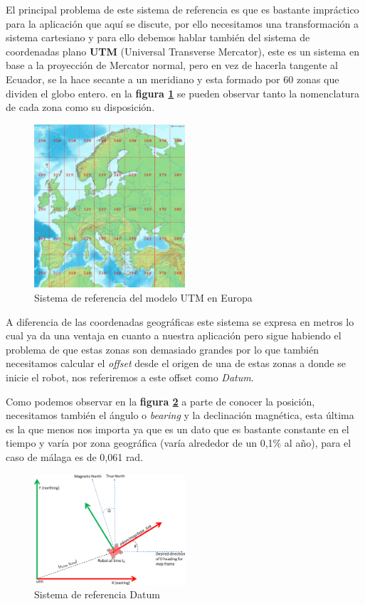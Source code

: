 El principal problema de este sistema de referencia es que es bastante impráctico para la aplicación que aquí se discute, por ello 
necesitamos una transformación a sistema cartesiano y para ello debemos hablar también del sistema de coordenadas plano \textbf{UTM} 
(Universal Transverse Mercator), este es un sistema en base a la proyección de Mercator normal, pero en vez de hacerla tangente al Ecuador, 
se la hace secante a un meridiano y esta formado por 60 zonas que dividen el globo entero.  en la \textbf{figura \ref{fig:utm_europa}} se 
pueden observar tanto la nomenclatura de cada zona como su disposición.

\begin{figure}[h]
    \centering
    \includegraphics[width=0.5\textwidth]{images/europe_utm.png}
    \caption{Sistema de referencia del modelo UTM en Europa}
    \label{fig:utm_europa}
\end{figure}


A diferencia de las coordenadas geográficas este sistema se expresa en metros lo cual ya da una ventaja en cuanto a nuestra aplicación pero 
sigue habiendo el problema de que estas zonas son demasiado grandes por lo que también necesitamos calcular el \textit{offset} desde el 
origen de una de estas zonas a donde se inicie el robot, nos referiremos a este offset como \textit{Datum}.

Como podemos observar en la \textbf{figura \ref{fig:datum}} a parte de conocer la posición, necesitamos también el ángulo o \textit{bearing} 
y la declinación magnética, esta última es la que menos nos importa ya que es un dato que es bastante constante en el tiempo y varía por 
zona geográfica (varía alrededor de un 0,1\% al año), para el caso de málaga es de 0,061 rad.



\begin{figure}[h]
    \centering
    \includegraphics[width=0.5\textwidth]{images/navsat_transform.png}
    \caption{Sistema de referencia Datum}
    \label{fig:datum}
\end{figure}


